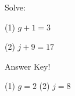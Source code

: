 \documentclass[twoside]{article}%
\begin{document}
%
\normalsize%
\linespread{1.3}%
\usetikzlibrary{calc}%
\pagestyle{header}%
\noindent%
\newline%
Solve:%
\newline%
\begin{minipage}{1.0\textwidth}%
(1) %
$g+1=3$%
\end{minipage}%
\vspace{1in}%
\newline%
\noindent%
\begin{minipage}{1.0\textwidth}%
(2) %
$j+9=17$%
\end{minipage}%
\vspace{1in}%
\newline%
\clearpage%
\clearpage%
\begin{center}%
\begin{Large}%
Answer Key!%
\newline%
\end{Large}%
\end{center}%
(1) $g=2$%
\newline%
(2) $j=8$%
\newline%
\clearpage%
\end{document}
